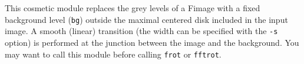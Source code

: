 This cosmetic module replaces the grey levels of a Fimage with 
a fixed background level (\verb+bg+)
outside the maximal centered disk included in
the input image. A smooth (linear) transition (the width can be specified with
the \verb+-s+ option) is performed at the junction
between the image and the background.
You may want to call this module before calling \verb+frot+ or \verb+fftrot+.